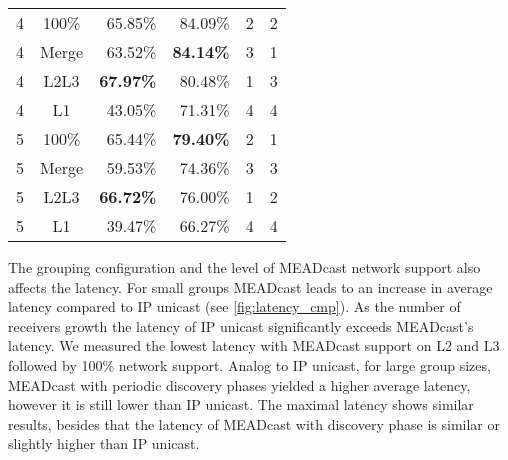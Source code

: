 \begin{table}[]
\begin{tabular}{@{}ccrrcc@{}}
4       & 100\%                    & 65.85\%                    & 84.09\%                   & 2             & 2           \\
4       & Merge                    & 63.52\%                    & \textbf{84.14\%}          & 3             & 1           \\
4       & L2L3                     & \textbf{67.97\%}           & 80.48\%                   & 1             & 3           \\
4       & L1                       & 43.05\%                    & 71.31\%                   & 4             & 4           \\ \midrule
5       & 100\%                    & 65.44\%                    & \textbf{79.40\%}          & 2             & 1           \\
5       & Merge                    & 59.53\%                    & 74.36\%                   & 3             & 3           \\
5       & L2L3                     & \textbf{66.72\%}           & 76.00\%                   & 1             & 2           \\
5       & L1                       & 39.47\%                    & 66.27\%                   & 4             & 4           \\ \bottomrule
\end{tabular}
\caption{}
\label{tab:mead_cmp}
\end{table}


The grouping configuration and the level of MEADcast network support also
    affects the latency.
For small groups MEADcast leads to an increase in average latency compared to
    IP unicast (see \autoref{fig:latency_cmp}).
As the number of receivers growth the latency of IP unicast significantly
    exceeds MEADcast's latency.
We measured the lowest latency with MEADcast support on L2 and L3 followed by
    100\% network support.
Analog to IP unicast, for large group sizes, MEADcast with periodic discovery
    phases yielded a higher average latency, however it is still lower than IP
    unicast.
The maximal latency shows similar results, besides that the latency of MEADcast
    with discovery phase is similar or slightly higher than IP unicast.

